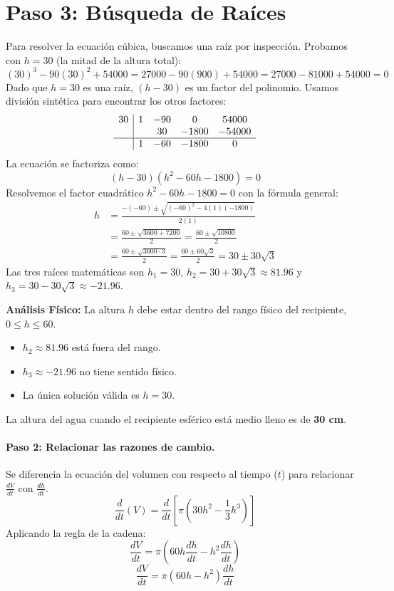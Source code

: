 \documentclass[12pt, letterpaper]{article}
\begin{document}
\section*{Paso 3: Búsqueda de Raíces}
Para resolver la ecuación cúbica, buscamos una raíz por inspección. Probamos con $h=30$ (la mitad de la altura total):
$$ (30)^3 - 90(30)^2 + 54000 = 27000 - 90(900) + 54000 = 27000 - 81000 + 54000 = 0 $$
Dado que $h=30$ es una raíz, $(h-30)$ es un factor del polinomio. Usamos división sintética para encontrar los otros factores:
$$ \begin{array}{c|cccc} 30 & 1 & -90 & 0 & 54000 \\ & & 30 & -1800 & -54000 \\ \hline & 1 & -60 & -1800 & 0 \\ \end{array} $$
La ecuación se factoriza como:
$$ (h-30)(h^2 - 60h - 1800) = 0 $$
Resolvemos el factor cuadrático $h^2 - 60h - 1800 = 0$ con la fórmula general:
\begin{align*}
    h &= \frac{-(-60) \pm \sqrt{(-60)^2 - 4(1)(-1800)}}{2(1)} \\
    &= \frac{60 \pm \sqrt{3600 + 7200}}{2} = \frac{60 \pm \sqrt{10800}}{2} \\
    &= \frac{60 \pm \sqrt{3600 \cdot 3}}{2} = \frac{60 \pm 60\sqrt{3}}{2} = 30 \pm 30\sqrt{3}
\end{align*}
Las tres raíces matemáticas son $h_1 = 30$, $h_2 = 30 + 30\sqrt{3} \approx 81.96$ y $h_3 = 30 - 30\sqrt{3} \approx -21.96$.

\textbf{Análisis Físico:} La altura $h$ debe estar dentro del rango físico del recipiente, $0 \le h \le 60$.
\begin{itemize}
    \item $h_2 \approx 81.96$ está fuera del rango.
    \item $h_3 \approx -21.96$ no tiene sentido físico.
    \item La única solución válida es $h=30$.
\end{itemize}
La altura del agua cuando el recipiente esférico está medio lleno es de \textbf{30 cm}.


\paragraph{Paso 2: Relacionar las razones de cambio.}
Se diferencia la ecuación del volumen con respecto al tiempo ($t$) para relacionar $\frac{dV}{dt}$ con $\frac{dh}{dt}$.
$$\frac{d}{dt}(V) = \frac{d}{dt} \left[ \pi \left(30h^2 - \frac{1}{3}h^3\right) \right]$$
Aplicando la regla de la cadena:
$$\frac{dV}{dt} = \pi \left(60h \frac{dh}{dt} - h^2 \frac{dh}{dt}\right)$$
$$\frac{dV}{dt} = \pi (60h - h^2) \frac{dh}{dt}$$
\end{document}
